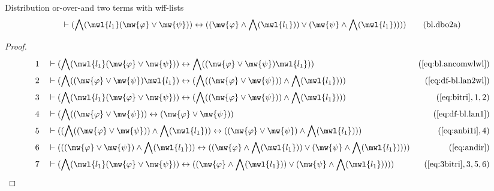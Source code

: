\begin{lemma} {Distribution or-over-and two terms with
wff-lists}
\begin{align}
\vdash ( \bigwedge( \mwl{l_1} ( \mw{\varphi} \vee \mw{\psi} ) ) \leftrightarrow
    ( ( \mw{\varphi} \wedge \bigwedge( \mwl{l_1} ) ) \vee ( \mw{\psi} \wedge
    \bigwedge( \mwl{l_1} ) ) ) )\label{eq:bl.dbo2a}\tag{bl.dbo2a}
\end{align}
\end{lemma}


\begin{proof}
\begin{align}
  1 &&  & \vdash ( \bigwedge( \mwl{l_1} ( \mw{\varphi} \vee \mw{\psi} ) )
     \leftrightarrow \bigwedge( ( \mw{\varphi} \vee
     \mw{\psi} ) \mwl{l_1} )
     )&(\mbox{\ref{eq:bl.ancomwlwl}})\notag
  \\ 2 &&  & \vdash ( \bigwedge( ( \mw{\varphi} \vee \mw{\psi} ) \mwl{l_1} )
     \leftrightarrow ( \bigwedge( ( \mw{\varphi} \vee
     \mw{\psi} ) ) \wedge \bigwedge( \mwl{l_1} ) )
     )&(\mbox{\ref{eq:df-bl.lan2wl}})\notag
  \\ 3 &&  & \vdash ( \bigwedge( \mwl{l_1} ( \mw{\varphi} \vee \mw{\psi} ) )
     \leftrightarrow ( \bigwedge( ( \mw{\varphi} \vee
     \mw{\psi} ) ) \wedge \bigwedge( \mwl{l_1} ) )
     )&(\mbox{\ref{eq:bitri}},1,2)\notag
  \\ 4 &&  & \vdash ( \bigwedge( ( \mw{\varphi} \vee \mw{\psi} ) )
     \leftrightarrow ( \mw{\varphi} \vee \mw{\psi} )
     )&(\mbox{\ref{eq:df-bl.lan1}})\notag
  \\ 5 &&  & \vdash ( ( \bigwedge( ( \mw{\varphi} \vee \mw{\psi} ) ) \wedge
     \bigwedge( \mwl{l_1} ) ) \leftrightarrow ( (
     \mw{\varphi} \vee \mw{\psi} ) \wedge \bigwedge(
     \mwl{l_1} ) ) )&(\mbox{\ref{eq:anbi1i}},4)\notag
  \\ 6 &&  & \vdash ( ( ( \mw{\varphi} \vee \mw{\psi} ) \wedge \bigwedge(
     \mwl{l_1} ) ) \leftrightarrow ( ( \mw{\varphi} \wedge
     \bigwedge( \mwl{l_1} ) ) \vee ( \mw{\psi} \wedge
     \bigwedge( \mwl{l_1} ) ) )
     )&(\mbox{\ref{eq:andir}})\notag
  \\ 7 &&  & \vdash ( \bigwedge( \mwl{l_1} ( \mw{\varphi} \vee \mw{\psi} ) )
     \leftrightarrow ( ( \mw{\varphi} \wedge \bigwedge(
     \mwl{l_1} ) ) \vee ( \mw{\psi} \wedge \bigwedge(
     \mwl{l_1} ) ) )
     )&(\mbox{\ref{eq:3bitri}},3,5,6)\notag
\end{align}
\end{proof}

